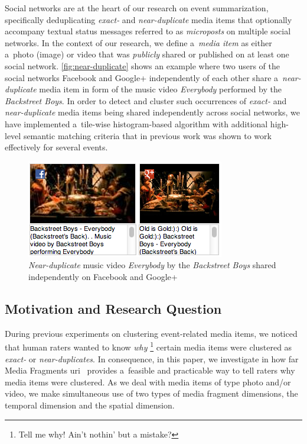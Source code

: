 \documentclass{article}
\begin{document}
Social networks are at the heart of our research on event summarization,
specifically deduplicating \emph{exact-} and \emph{near-duplicate}
media items that optionally accompany textual status messages
referred to as \emph{microposts} on multiple social networks. 
In the context of our research, we define a~\emph{media item}
as either a~photo (image) or video
that was \emph{publicly} shared or published
on at least one social network.
\autoref{fig:near-duplicate} shows an example
where two users of the social networks Facebook and Google+
independently of each other share a~\emph{near-duplicate} media item
in form of the music video \emph{Everybody}
performed by the \emph{Backstreet Boys}.
In order to detect and cluster such occurrences
of \emph{exact-} and \emph{near-duplicate}
media items being shared independently across social networks,
we have implemented a~tile-wise histogram-based algorithm
with additional high-level semantic matching criteria
that in previous work was shown to work effectively for several events.


\begin{figure}[b!]
  \centering
  \includegraphics[width=0.75\linewidth]{./backstreetboys.png}
  \caption{\emph{Near-duplicate} music video \emph{Everybody}
    by the \emph{Backstreet Boys} shared
    independently on Facebook and Google+}
  \label{fig:near-duplicate}
\end{figure}

\subsection{Motivation and Research Question}
\label{sec:motivation-and-research-question}

During previous experiments on clustering event-related media items,
we noticed that human raters wanted to know \emph{why}%
\footnote{Tell me why! Ain't nothin' but a mistake?}
certain media items were clustered as \emph{exact-} or \emph{near-duplicates}.
In consequence, in this paper, we investigate in how far
Media Fragments {\sc uri}~\cite{troncy2012mediafragments}
provides a~feasible and practicable way
to tell raters why media items were clustered.
As we deal with media items of type photo and/or video,
we make simultaneous use of two types of media fragment dimensions,
the temporal dimension and the spatial dimension.
\end{document}
